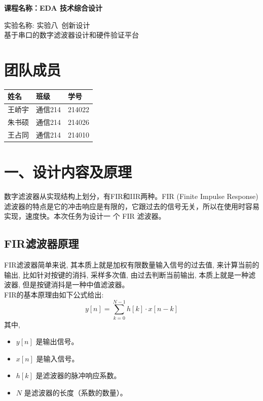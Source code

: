 \documentclass{article}
\newcommand{\fourhao}{\fontsize{14pt}{\baselineskip}\selectfont} %
\newcommand{\xiaosihao}{\fontsize{12pt}{\baselineskip}\selectfont} %
\begin{document}
\begin{titlepage}
    \centering
    \vspace*{2cm}

    \Huge
    \textbf{课程名称：EDA 技术综合设计}

    \vspace{3cm}

    \LARGE
    实验名称: 实验八\ 创新设计\\
    基于串口的数字滤波器设计和硬件验证平台

    \vspace{5cm}

    \centering
    \section*{团队成员}
    \Large
    \begin{tabular}{| l | l | l |}
        \hline
        \textbf{姓名} & \textbf{班级} & \textbf{学号} \\ 
        \hline
        王峤宇 & 通信214 & 214022 \\ 
        \hline
        朱书硕 & 通信214 & 214026 \\ 
        \hline
        王占同 & 通信214 & 214010 \\ 
        \hline
    \end{tabular}
    \vfill

    \vspace{1cm}
\end{titlepage}

\newpage
\section*{\fourhao 一、设计内容及原理}
\xiaosihao
{}
数字滤波器从实现结构上划分，有FIR和IIR两种。FIR (Finite Impulse Response)滤波器的特点是它的冲击响应是有限的，它跟过去的信号无关，所以在使用时容易实现，速度快。本次任务为设计一
个 FIR 滤波器。
\subsection*{FIR滤波器原理}
FIR滤波器简单来说, 其本质上就是加权有限数量输入信号的过去值, 来计算当前的输出, 
比如针对按键的消抖, 采样多次值, 由过去判断当前输出, 本质上就是一种滤波器, 但是按键消抖是一种中值滤波器。\\
FIR的基本原理由如下公式给出:
\begin{equation}
    y[n] = \sum_{k=0}^{N-1} h[k] \cdot x[n-k]
\end{equation}
其中, 
\begin{itemize}
    \item $y[n]$ 是输出信号。
    \item $x[n]$ 是输入信号。
    \item $h[k]$ 是滤波器的脉冲响应系数。
    \item $N$ 是滤波器的长度（系数的数量）。
\end{itemize}
\end{document}
